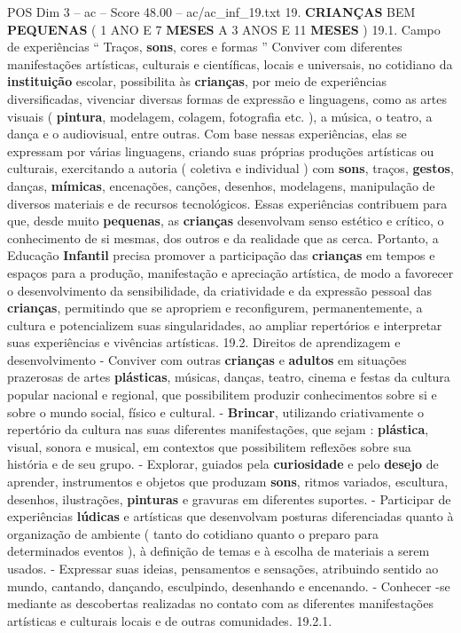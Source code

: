 \begin{textsample}{POS Dim 3 – ac – Score 48.00 – ac/ac\_inf\_19.txt}  \label{ex:f3_pos_029}
19. \textbf{CRIANÇAS} BEM \textbf{PEQUENAS} ( 1 ANO E 7 \textbf{MESES} A 3 ANOS E 11 \textbf{MESES} ) 19.1.
Campo de experiências “ Traços, \textbf{sons}, cores e formas ” Conviver com diferentes manifestações artísticas, culturais e científicas, locais e universais, no cotidiano da \textbf{instituição} escolar, possibilita às \textbf{crianças}, por meio de experiências diversificadas, vivenciar diversas formas de expressão e linguagens, como as artes visuais ( \textbf{pintura}, modelagem, colagem, fotografia etc. ), a música, o teatro, a dança e o audiovisual, entre outras.
Com base nessas experiências, elas se expressam por várias linguagens, criando suas próprias produções artísticas ou culturais, exercitando a autoria ( coletiva e individual ) com \textbf{sons}, traços, \textbf{gestos}, danças, \textbf{mímicas}, encenações, canções, desenhos, modelagens, manipulação de diversos materiais e de recursos tecnológicos.
Essas experiências contribuem para que, desde muito \textbf{pequenas}, as \textbf{crianças} desenvolvam senso estético e crítico, o conhecimento de si mesmas, dos outros e da realidade que as cerca.
Portanto, a Educação \textbf{Infantil} precisa promover a participação das \textbf{crianças} em tempos e espaços para a produção, manifestação e apreciação artística, de modo a favorecer o desenvolvimento da sensibilidade, da criatividade e da expressão pessoal das \textbf{crianças}, permitindo que se apropriem e reconfigurem, permanentemente, a cultura e potencializem suas singularidades, ao ampliar repertórios e interpretar suas experiências e vivências artísticas. 19.2.
Direitos de aprendizagem e desenvolvimento - Conviver com outras \textbf{crianças} e \textbf{adultos} em situações prazerosas de artes \textbf{plásticas}, músicas, danças, teatro, cinema e festas da cultura popular nacional e regional, que possibilitem produzir conhecimentos sobre si e sobre o mundo social, físico e cultural. - \textbf{Brincar}, utilizando criativamente o repertório da cultura nas suas diferentes manifestações, que sejam : \textbf{plástica}, visual, sonora e musical, em contextos que possibilitem reflexões sobre sua história e de seu grupo. - Explorar, guiados pela \textbf{curiosidade} e pelo \textbf{desejo} de aprender, instrumentos e objetos que produzam \textbf{sons}, ritmos variados, escultura, desenhos, ilustrações, \textbf{pinturas} e gravuras em diferentes suportes. - Participar de experiências \textbf{lúdicas} e artísticas que desenvolvam posturas diferenciadas quanto à organização de ambiente ( tanto do cotidiano quanto o preparo para determinados eventos ), à definição de temas e à escolha de materiais a serem usados. - Expressar suas ideias, pensamentos e sensações, atribuindo sentido ao mundo, cantando, dançando, esculpindo, desenhando e encenando. - Conhecer -se mediante as descobertas realizadas no contato com as diferentes manifestações artísticas e culturais locais e de outras comunidades. 19.2.1.

\end{textsample}
